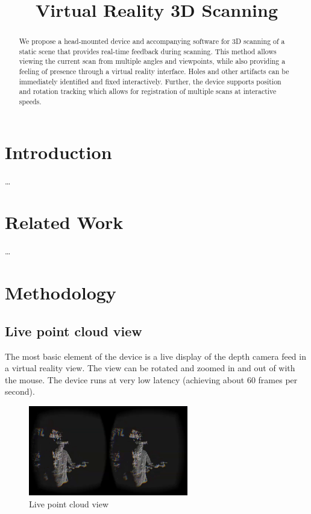 \documentclass[pageno]{jpaper}
\begin{document}
\title{Virtual Reality 3D Scanning}

\date{}
\maketitle

\thispagestyle{empty}

\begin{abstract}
  We propose a head-mounted device and accompanying software for 3D scanning of
  a static scene that provides real-time feedback during scanning. This method
  allows viewing the current scan from multiple angles and viewpoints, while also
  providing a feeling of presence through a virtual reality interface. Holes and
  other artifacts can be immediately identified and fixed interactively. Further,
  the device supports position and rotation tracking which allows for registration
  of multiple scans at interactive speeds.
\end{abstract}

\section{Introduction}

\ldots

\section{Related Work}

\ldots

\section{Methodology}

\subsection{Live point cloud view}
\label{sec:live-view}

The most basic element of the device is a live display of the depth camera feed
in a virtual reality view. The view can be rotated and zoomed in and out of with
the mouse. The device runs at very low latency (achieving about 60 frames per
second).

\begin{figure}
  \centering
    \includegraphics[width=0.62\textwidth]{shot2.png}
  \caption{Live point cloud view}
  \label{fig:live-view}
\end{figure}
\end{document}
